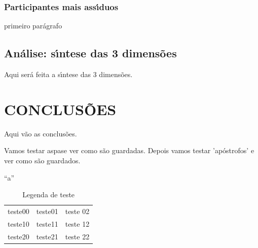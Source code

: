 \documentclass[
12pt,		%
openright,	%
twoside,  %
a4paper,			%
chapter=TITLE,		%
english,			%
french,				%
spanish,			%
brazil				%
]{USPSC-classe/USPSC_RedarTex}
\begin{document}
\subsection[Participantes mais ass\'{\i}duos]{Participantes mais ass\'{\i}duos}\label{Participantes mais ass\'{\i}duos}
primeiro par\'agrafo








\section[An\'alise: s\'{\i}ntese das 3 dimens\~oes]{An\'alise: s\'{\i}ntese das 3 dimens\~oes}\label{An\'alise: s\'{\i}ntese das 3 dimens\~oes}
Aqui ser\'a feita a s\'{\i}ntese das 3 dimens\~oes.








\chapter[CONCLUS\~OES]{CONCLUS\~OES}\label{CONCLUS\~OES}
Aqui v\~ao as conclus\~oes.








Vamos testar \textquotedbl aspas\textquotedbl  e ver como s\~ao guardadas. Depois vamos testar 'ap\'ostrofos' e ver como s\~ao guardados.








``a''












\begin{table}[Htb]
\tiny
\caption{\label{e1fee5245f1f580d36a53669e2e1e0d16ec34593}Legenda de teste}

\centering
\begin{tabular}{|c|c|c|}
\hline
teste00  &  teste01  &  teste 02 \\
teste10  &  teste11  &  teste 12 \\
teste20  &  teste21  &  teste 22 \\
\hline
\end{tabular}
\end{table}
\end{document}
